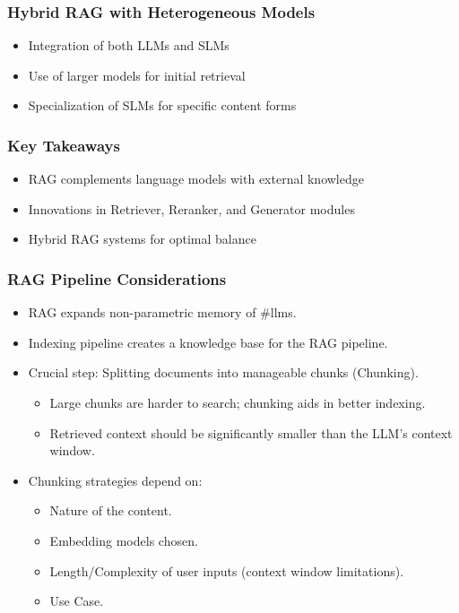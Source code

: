 \begin{frame}[fragile]\frametitle{Hybrid RAG with Heterogeneous Models}
  \begin{itemize}
    \item Integration of both LLMs and SLMs
    \item Use of larger models for initial retrieval
    \item Specialization of SLMs for specific content forms
  \end{itemize}
\end{frame}

\begin{frame}[fragile]\frametitle{Key Takeaways}
  \begin{itemize}
    \item RAG complements language models with external knowledge
    \item Innovations in Retriever, Reranker, and Generator modules
    \item Hybrid RAG systems for optimal balance
  \end{itemize}
\end{frame}


\begin{frame}[fragile]\frametitle{RAG Pipeline Considerations}
    \begin{itemize}
        \item RAG expands non-parametric memory of \#llms.
        \item Indexing pipeline creates a knowledge base for the RAG pipeline.
        \item Crucial step: Splitting documents into manageable chunks (Chunking).
            \begin{itemize}
                \item Large chunks are harder to search; chunking aids in better indexing.
                \item Retrieved context should be significantly smaller than the LLM's context window.
            \end{itemize}
        \item Chunking strategies depend on:
            \begin{itemize}
                \item Nature of the content.
                \item Embedding models chosen.
                \item Length/Complexity of user inputs (context window limitations).
                \item Use Case.
            \end{itemize}
    \end{itemize}
\end{frame}


